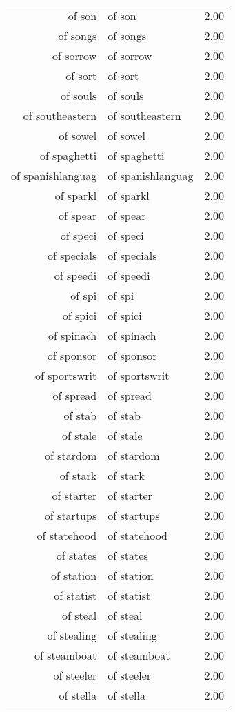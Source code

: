 \begin{table}[ht]
\begin{tabular}{rlr}
  of son & of son & 2.00 \\ 
  of songs & of songs & 2.00 \\ 
  of sorrow & of sorrow & 2.00 \\ 
  of sort & of sort & 2.00 \\ 
  of souls & of souls & 2.00 \\ 
  of southeastern & of southeastern & 2.00 \\ 
  of sowel & of sowel & 2.00 \\ 
  of spaghetti & of spaghetti & 2.00 \\ 
  of spanishlanguag & of spanishlanguag & 2.00 \\ 
  of sparkl & of sparkl & 2.00 \\ 
  of spear & of spear & 2.00 \\ 
  of speci & of speci & 2.00 \\ 
  of specials & of specials & 2.00 \\ 
  of speedi & of speedi & 2.00 \\ 
  of spi & of spi & 2.00 \\ 
  of spici & of spici & 2.00 \\ 
  of spinach & of spinach & 2.00 \\ 
  of sponsor & of sponsor & 2.00 \\ 
  of sportswrit & of sportswrit & 2.00 \\ 
  of spread & of spread & 2.00 \\ 
  of stab & of stab & 2.00 \\ 
  of stale & of stale & 2.00 \\ 
  of stardom & of stardom & 2.00 \\ 
  of stark & of stark & 2.00 \\ 
  of starter & of starter & 2.00 \\ 
  of startups & of startups & 2.00 \\ 
  of statehood & of statehood & 2.00 \\ 
  of states & of states & 2.00 \\ 
  of station & of station & 2.00 \\ 
  of statist & of statist & 2.00 \\ 
  of steal & of steal & 2.00 \\ 
  of stealing & of stealing & 2.00 \\ 
  of steamboat & of steamboat & 2.00 \\ 
  of steeler & of steeler & 2.00 \\ 
  of stella & of stella & 2.00 \\ 

\end{tabular}
\end{table}
